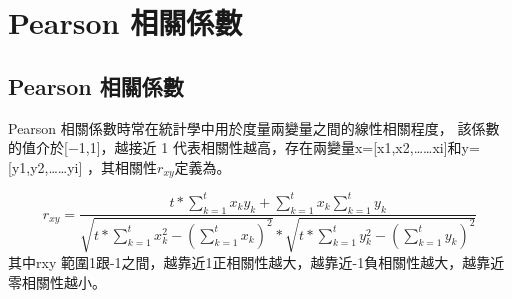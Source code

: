 \chapter{Pearson 相關係數}
\label{chapter:intro}
\section{Pearson 相關係數}
Pearson 相關係數時常在統計學中用於度量兩變量之間的線性相關程度， 該係數的值介於[−1,1]，越接近 1 代表相關性越高，存在兩變量x=[x1,x2,……xi]和y=[y1,y2,……yi] ，其相關性$r_{xy}$定義為。

\begin{equation}
\label{eqn:Pearson }
    r_{xy}=\frac{t\ast \sum_{k=1}^{t}x_ky_k+\sum_{k=1}^{t}x_k\sum_{k=1}^{t}y_k}{\sqrt{t\ast \sum_{k=1}^{t}x_k^2-(\sum_{k=1}^{t}x_k)^2}\ast\sqrt{t\ast \sum_{k=1}^{t}y_k^2-(\sum_{k=1}^{t}y_k)^2}}
\end{equation}
其中rxy 範圍1跟-1之間，越靠近1正相關性越大，越靠近-1負相關性越大，越靠近零相關性越小。
    
